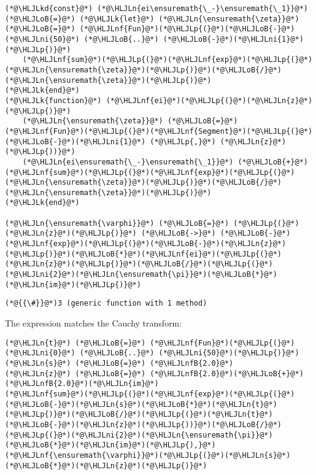 \documentclass[12pt,a4paper]{article}
\newcommand{\HLJLk}[1]{\textcolor[RGB]{148,91,176}{\textbf{#1}}}
\newcommand{\HLJLkd}[1]{\textcolor[RGB]{214,102,97}{\textit{#1}}}
\newcommand{\HLJLn}[1]{#1}
\newcommand{\HLJLnf}[1]{\textcolor[RGB]{66,102,213}{#1}}
\newcommand{\HLJLnfB}[1]{\textcolor[RGB]{59,151,46}{#1}}
\newcommand{\HLJLni}[1]{\textcolor[RGB]{59,151,46}{#1}}
\newcommand{\HLJLoB}[1]{\textcolor[RGB]{102,102,102}{\textbf{#1}}}
\newcommand{\HLJLp}[1]{#1}
\begin{document}
\begin{lstlisting}
(*@\HLJLkd{const}@*) (*@\HLJLn{ei\ensuremath{\_-}\ensuremath{\_1}}@*) (*@\HLJLoB{=}@*) (*@\HLJLk{let}@*) (*@\HLJLn{\ensuremath{\zeta}}@*) (*@\HLJLoB{=}@*) (*@\HLJLnf{Fun}@*)(*@\HLJLp{(}@*)(*@\HLJLoB{-}@*)(*@\HLJLni{50}@*) (*@\HLJLoB{..}@*) (*@\HLJLoB{-}@*)(*@\HLJLni{1}@*)(*@\HLJLp{)}@*)
    (*@\HLJLnf{sum}@*)(*@\HLJLp{(}@*)(*@\HLJLnf{exp}@*)(*@\HLJLp{(}@*)(*@\HLJLn{\ensuremath{\zeta}}@*)(*@\HLJLp{)}@*)(*@\HLJLoB{/}@*)(*@\HLJLn{\ensuremath{\zeta}}@*)(*@\HLJLp{)}@*)
(*@\HLJLk{end}@*)
(*@\HLJLk{function}@*) (*@\HLJLnf{ei}@*)(*@\HLJLp{(}@*)(*@\HLJLn{z}@*)(*@\HLJLp{)}@*)
    (*@\HLJLn{\ensuremath{\zeta}}@*) (*@\HLJLoB{=}@*) (*@\HLJLnf{Fun}@*)(*@\HLJLp{(}@*)(*@\HLJLnf{Segment}@*)(*@\HLJLp{(}@*)(*@\HLJLoB{-}@*)(*@\HLJLni{1}@*) (*@\HLJLp{,}@*) (*@\HLJLn{z}@*)(*@\HLJLp{))}@*)
    (*@\HLJLn{ei\ensuremath{\_-}\ensuremath{\_1}}@*) (*@\HLJLoB{+}@*) (*@\HLJLnf{sum}@*)(*@\HLJLp{(}@*)(*@\HLJLnf{exp}@*)(*@\HLJLp{(}@*)(*@\HLJLn{\ensuremath{\zeta}}@*)(*@\HLJLp{)}@*)(*@\HLJLoB{/}@*)(*@\HLJLn{\ensuremath{\zeta}}@*)(*@\HLJLp{)}@*)
(*@\HLJLk{end}@*)

(*@\HLJLn{\ensuremath{\varphi}}@*) (*@\HLJLoB{=}@*) (*@\HLJLp{(}@*)(*@\HLJLn{z}@*)(*@\HLJLp{)}@*) (*@\HLJLoB{->}@*) (*@\HLJLoB{-}@*)(*@\HLJLnf{exp}@*)(*@\HLJLp{(}@*)(*@\HLJLoB{-}@*)(*@\HLJLn{z}@*)(*@\HLJLp{)}@*)(*@\HLJLoB{*}@*)(*@\HLJLnf{ei}@*)(*@\HLJLp{(}@*)(*@\HLJLn{z}@*)(*@\HLJLp{)}@*)(*@\HLJLoB{/}@*)(*@\HLJLp{(}@*)(*@\HLJLni{2}@*)(*@\HLJLn{\ensuremath{\pi}}@*)(*@\HLJLoB{*}@*)(*@\HLJLn{im}@*)(*@\HLJLp{)}@*)
\end{lstlisting}

\begin{lstlisting}
(*@{{\#}}@*)3 (generic function with 1 method)
\end{lstlisting}


The expression matches the Cauchy transform:


\begin{lstlisting}
(*@\HLJLn{t}@*) (*@\HLJLoB{=}@*) (*@\HLJLnf{Fun}@*)(*@\HLJLp{(}@*)(*@\HLJLni{0}@*) (*@\HLJLoB{..}@*) (*@\HLJLni{50}@*)(*@\HLJLp{)}@*)
(*@\HLJLn{s}@*) (*@\HLJLoB{=}@*) (*@\HLJLnfB{2.0}@*)
(*@\HLJLn{z}@*) (*@\HLJLoB{=}@*) (*@\HLJLnfB{2.0}@*)(*@\HLJLoB{+}@*)(*@\HLJLnfB{2.0}@*)(*@\HLJLn{im}@*)
(*@\HLJLnf{sum}@*)(*@\HLJLp{(}@*)(*@\HLJLnf{exp}@*)(*@\HLJLp{(}@*)(*@\HLJLoB{-}@*)(*@\HLJLn{s}@*)(*@\HLJLoB{*}@*)(*@\HLJLn{t}@*)(*@\HLJLp{)}@*)(*@\HLJLoB{/}@*)(*@\HLJLp{(}@*)(*@\HLJLn{t}@*)(*@\HLJLoB{-}@*)(*@\HLJLn{z}@*)(*@\HLJLp{))}@*)(*@\HLJLoB{/}@*)(*@\HLJLp{(}@*)(*@\HLJLni{2}@*)(*@\HLJLn{\ensuremath{\pi}}@*)(*@\HLJLoB{*}@*)(*@\HLJLn{im}@*)(*@\HLJLp{),}@*) (*@\HLJLnf{\ensuremath{\varphi}}@*)(*@\HLJLp{(}@*)(*@\HLJLn{s}@*)(*@\HLJLoB{*}@*)(*@\HLJLn{z}@*)(*@\HLJLp{)}@*)
\end{lstlisting}
\end{document}
